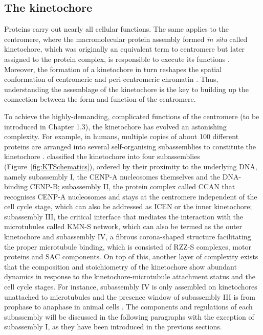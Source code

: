 
\subsection{The kinetochore}

Proteins carry out nearly all cellular functions. The same applies to the centromere, where the macromolecular protein assembly formed \textit{in situ} called kinetochore, which was originally an equivalent term to centromere \citep{Sharp1921IntroductionCytology, Darlington1936TheEnquiry} but later assigned to the protein complex, is responsible to execute its functions \citep{McAinsh2022TheKinetochores, McKinley2015TheFunction, Musacchio2017AFunction}. Moreover, the formation of a kinetochore in turn reshapes the spatial conformation of centromeric and peri-centromeric chromatin \citep{McAinsh2022TheKinetochores}. Thus, understanding the assemblage of the kinetochore is the key to building up the connection between the form and function of the centromere.

To achieve the highly-demanding, complicated functions of the centromere (to be introduced in Chapter 1.3), the kinetochore has evolved an astonishing complexity. For example, in humans, multiple copies of about 100 different proteins are arranged into several self-organising subassemblies to constitute the kinetochore \citep{Cheeseman2014TheKinetochore}. \cite{McAinsh2022TheKinetochores} classified the kinetochore into four subassemblies (Figure~\ref{fig:KTSchematics}), ordered by their proximity to the underlying DNA, namely subassembly I, the CENP-A nucleosomes themselves and the DNA-binding CENP-B; subassembly II, the protein complex called CCAN that recognises CENP-A nucleosomes and stays at the centromere independent of the cell cycle stage, which can also be addressed as ICEN or the inner kinetochore; subassembly III, the critical interface that mediates the interaction with the microtubules called KMN-S network, which can also be termed as the outer kinetochore and subassembly IV, a fibrous corona-shaped structure facilitating the proper microtubule binding, which is consisted of RZZ-S complexes, motor proteins and SAC components. On top of this, another layer of complexity exists that the composition and stoichiometry of the kinetochore show abundant dynamics in response to the kinetochore-microtubule attachment status and the cell cycle stages. For instance, subassembly IV is only assembled on kinetochores unattached to microtubules and the presence window of subassembly III is from prophase to anaphase in animal cells \citep{Hara2020DynamicsProgression}. The components and regulations of each subassembly will be discussed in the following paragraphs with the exception of subassembly I, as they have been introduced in the previous sections. 

